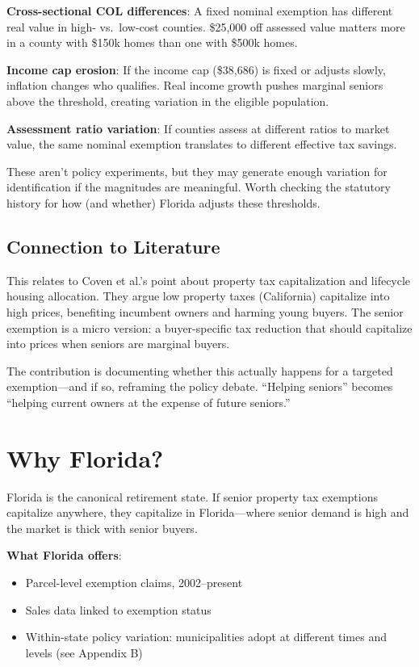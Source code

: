 \documentclass[11pt]{article}
\begin{document}
\textbf{Cross-sectional COL differences}: A fixed nominal exemption has different real value in high- vs.\ low-cost counties. \$25,000 off assessed value matters more in a county with \$150k homes than one with \$500k homes.

\textbf{Income cap erosion}: If the income cap (\$38,686) is fixed or adjusts slowly, inflation changes who qualifies. Real income growth pushes marginal seniors above the threshold, creating variation in the eligible population.

\textbf{Assessment ratio variation}: If counties assess at different ratios to market value, the same nominal exemption translates to different effective tax savings.

These aren't policy experiments, but they may generate enough variation for identification if the magnitudes are meaningful. Worth checking the statutory history for how (and whether) Florida adjusts these thresholds.

\subsection{Connection to Literature}

This relates to Coven et al.'s point about property tax capitalization and lifecycle housing allocation. They argue low property taxes (California) capitalize into high prices, benefiting incumbent owners and harming young buyers. The senior exemption is a micro version: a buyer-specific tax reduction that should capitalize into prices when seniors are marginal buyers.

The contribution is documenting whether this actually happens for a targeted exemption---and if so, reframing the policy debate. ``Helping seniors'' becomes ``helping current owners at the expense of future seniors.''

\section{Why Florida?}

Florida is the canonical retirement state. If senior property tax exemptions capitalize anywhere, they capitalize in Florida---where senior demand is high and the market is thick with senior buyers.

\textbf{What Florida offers}:
\begin{itemize}
    \item Parcel-level exemption claims, 2002--present
    \item Sales data linked to exemption status
    \item Within-state policy variation: municipalities adopt at different times and levels (see Appendix B)
\end{itemize}
\end{document}
